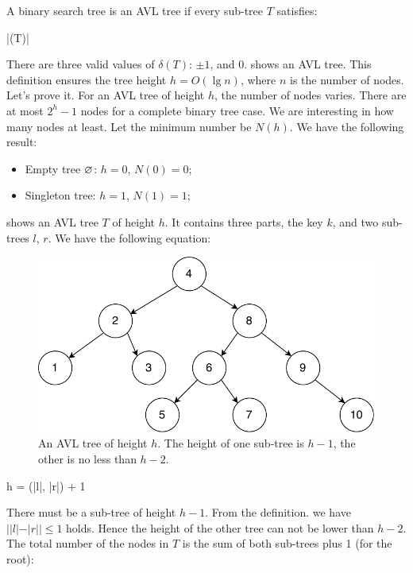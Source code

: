 \documentclass[b5paper]{article}
\begin{document}
A binary search tree is an AVL tree if every sub-tree $T$ satisfies:

\be
  |\delta(T)| 
  \label{eq:avl-rule}
\ee

There are three valid values of $\delta(T)$: $\pm 1$, and 0.  shows an AVL tree. This definition ensures the tree height $h = O(\lg n)$, where $n$ is the number of nodes. Let's prove it. For an AVL tree of height $h$, the number of nodes varies. There are at most $2^h - 1$ nodes for a complete binary tree case. We are interesting in how many nodes at least. Let the minimum number be $N(h)$. We have the following result:

\begin{itemize}
\item Empty tree $\varnothing$: $h = 0$, $N(0) = 0$;
\item Singleton tree: $h = 1$, $N(1) = 1$;
\end{itemize}

 shows an AVL tree $T$ of height $h$. It contains three parts, the key $k$, and two sub-trees $l$, $r$. We have the following equation:

\begin{figure}[htbp]
   \centering
   \includegraphics[scale=0.5, page=2]{img/avltree}
   \caption{An AVL tree of height $h$. The height of one sub-tree is $h-1$, the other is no less than $h-2$.}
   \label{fig:N-h-relation}
\end{figure}

\be
  h = \max(|l|, |r|) + 1
\ee

There must be a sub-tree of height $h - 1$. From the definition. we have $||l|-|r|| \leq 1$ holds. Hence the height of the other tree can not be lower than $h - 2$. The total number of the nodes in $T$ is the sum of both sub-trees plus 1 (for the root):
\end{document}

